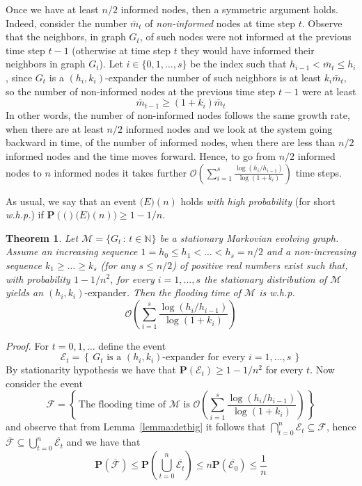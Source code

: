 \documentclass[10pt,a4paper]{article}
\newtheorem{theorem}[definition]{Theorem}
\newcommand{\Prob}[1]{\mathbf{P} \left( #1 \right)}
\newcommand{\proof}{\noindent\textit{Proof. }}
\newcommand{\qed}{\hspace{\stretch{1}$\square$}}
\begin{document}
\smallskip\noindent Once we have at least $n/2$ informed nodes, then a symmetric argument holds. Indeed, consider the number $\bar{m}_t$ of \emph{non-informed} nodes at time step $t$. Observe that the neighbors, in graph $G_t$, of such nodes were not informed at the previous time step $t-1$ (otherwise at time step $t$ they would have informed their neighbors in graph $G_t$). Let $i \in \{0, 1, \dots, s\}$ be the index such that $h_{i-1} < \bar{m}_t \leqslant h_i$, since $G_t$ is a $(h_i,k_i)$-expander the number of such neighbors is at least $k_i \bar{m}_t$, so the number of non-informed nodes at the previous time step $t-1$ were at least
$$
\bar{m}_{t-1} \geqslant (1+k_i) \bar{m}_t
$$
In other words, the number of non-informed nodes follows the same growth rate, when there are at least $n/2$ informed nodes and we look at the system going backward in time, of the number of informed nodes, when there are less than $n/2$ informed nodes and the time moves forward. Hence, to go from $n/2$ informed nodes to $n$ informed nodes it takes further $\mathcal{O}\left( \sum_{i=1}^s \frac{\log (h_i/h_{i-1})}{\log (1 + k_i)} \right)$ time steps.
\qed

As usual, we say that an event $\mathcal(E)(n)$ holds \emph{with high probability} (for short \emph{w.h.p.}) if 
 $\Prob(\mathcal(E)(n)) \geqslant 1- 1/n$.
\begin{theorem}\label{theorem:big}
Let $\mathcal{M} = \{ G_t \,:\, t \in \mathbb{N} \}$ be a stationary Markovian evolving graph. Assume an increasing sequence $1 = h_0 \leqslant h_1 < \dots < h_s = n/2$ and a non-increasing sequence $k_1 \geqslant \dots \geqslant k_s$ (for any $s \leq n/2$) of positive real numbers exist such that, with probability $1 - 1/n^2$, for every $i=1, \dots, s$ the stationary distribution of $\mathcal{M}$ yields an $(h_i,k_i)\mbox{-expander}$. Then the flooding time of $\mathcal{M}$ is w.h.p.
$$
\mathcal{O}\left( \sum_{i=1}^s \frac{\log (h_i/h_{i-1})}{\log (1 + k_i)} \right)
$$
\end{theorem}
\proof
For $t = 0, 1, \dots$ define the event
$$
\mathcal{E}_t = \left\{ \, G_t \mbox{ is a } (h_i,k_i)\mbox{-expander for every } i = 1, \dots, s \, \right\}
$$
By stationarity hypothesis we have that $\Prob{\mathcal{E}_t} \geqslant 1 - 1/n^2$ for every $t$. Now consider the event
$$
\mathcal{F} = \left\{ \, \mbox{The flooding time of } \mathcal{M} \mbox{ is } \mathcal{O}\left( \sum_{i=1}^s \frac{\log (h_i/h_{i-1})}{\log (1 + k_i)} \right) \, \right\}
$$
and observe that from Lemma~\ref{lemma:detbig} it follows that $\bigcap_{t=0}^n \mathcal{E}_t \subseteq \mathcal{F}$, hence $\overline{\mathcal{F}} \subseteq \bigcup_{t=0}^n \overline{\mathcal{E}_t}$ and we have that
$$
\Prob{\overline{\mathcal{F}}} \leqslant \Prob{\bigcup_{t=0}^n \overline{\mathcal{E}_t}} \leqslant n \Prob{\overline{\mathcal{E}_0}} \leqslant \frac{1}{n}
$$
\qed
\end{document}
